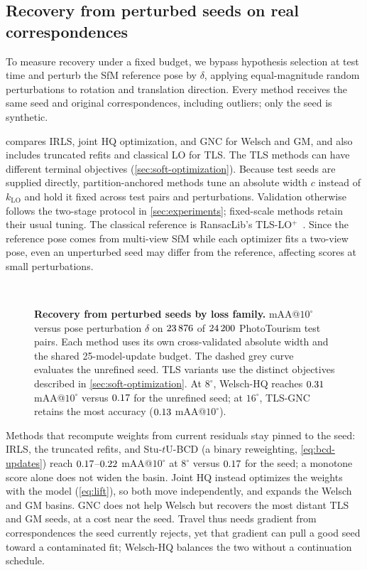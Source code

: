 \documentclass[runningheads]{llncs}
\newcommand{\stuU}{Stu-$t$U}          %
\newcommand{\klo}{k_{\mathrm{LO}}}
\begin{document}
\subsection{Recovery from perturbed seeds on real correspondences}
\label{sec:exp-ladder}
To measure recovery under a fixed budget, we bypass hypothesis selection at
test time and perturb the SfM reference pose by $\delta$, applying
equal-magnitude random perturbations to rotation and translation direction.
Every method receives the same seed and original correspondences, including
outliers; only the seed is synthetic.

 compares IRLS, joint HQ optimization, and GNC for
Welsch and GM, and also includes truncated refits and classical LO for TLS.
The TLS methods can have different terminal objectives
(\cref{sec:soft-optimization}). Because test seeds are supplied directly,
partition-anchored methods tune an absolute width $c$ instead of $\klo$ and
hold it fixed across test pairs and perturbations. Validation otherwise
follows the two-stage protocol in \cref{sec:experiments}; fixed-scale
methods retain their usual tuning. The classical reference is RansacLib's
TLS-LO$^+$~\cite{Sattler2019Github}. Since the reference pose comes from
multi-view SfM while each optimizer fits a two-view pose, even an unperturbed
seed may differ from the reference, affecting scores at small perturbations.

\begin{figure}[!t]
	\centering
	\\[3pt]
	\caption{\textbf{Recovery from perturbed seeds by loss family.}
		mAA@$10^\circ$ versus pose perturbation $\delta$ on $23\,876$ of
		$24\,200$ PhotoTourism test pairs. Each method uses its own
		cross-validated absolute width and the shared 25-model-update budget.
		The dashed grey curve evaluates the unrefined seed. TLS variants
		use the distinct objectives described in \cref{sec:soft-optimization}.
		At $8^\circ$, Welsch-HQ reaches $0.31$ mAA@$10^\circ$ versus $0.17$ for
		the unrefined seed; at $16^\circ$, TLS-GNC retains the most accuracy
		($0.13$ mAA@$10^\circ$).}
	\label{fig:basin-ladder}
\end{figure}

Methods that recompute weights from current residuals stay pinned to the
seed: IRLS, the truncated refits, and \stuU{}-BCD (a binary reweighting,
\cref{eq:bcd-updates}) reach $0.17$--$0.22$ mAA@$10^\circ$ at $8^\circ$
versus $0.17$ for the seed; a monotone score alone does not widen the
basin. Joint HQ instead optimizes the weights with the model
(\cref{eq:lift}), so both move independently, and expands the Welsch and GM
basins. GNC does not help Welsch but recovers the most distant TLS and GM
seeds, at a cost near the seed. Travel thus needs gradient from
correspondences the seed currently rejects, yet that gradient can pull a
good seed toward a contaminated fit; Welsch-HQ balances the two without a
continuation schedule.
\end{document}
